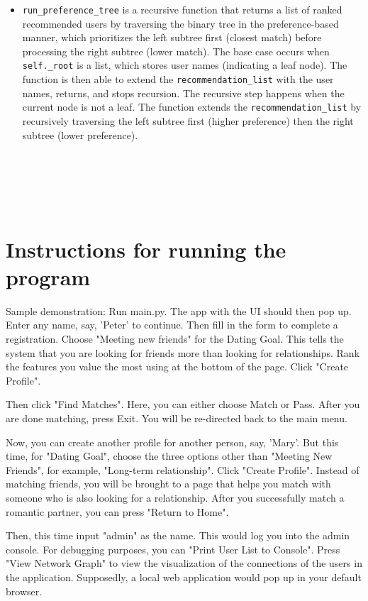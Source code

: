 \documentclass[fontsize=11pt]{article}
\begin{document}
\begin{itemize}
\\
\item \texttt{run\_preference\_tree} is a recursive function that returns a list of ranked recommended users by traversing the binary tree in the preference-based manner, which prioritizes the left subtree first (closest match) before processing the right subtree (lower match). The base case occurs when \texttt{self.\_root} is a list, which stores user names (indicating a leaf node). The function is then able to extend the \texttt{recommendation\_list} with the user names, returns, and stops recursion. The recursive step happens when the current node is not a leaf. The function extends the \texttt{recommendation\_list} by recursively traversing the left subtree first (higher preference) then the right subtree (lower preference).
\end{itemize}
\\

\\
\\

\\
\section*{Instructions for running the program}
Sample demonstration: Run main.py. The app with the UI should then pop up. Enter any name, say, 'Peter' to continue. Then fill in the form to complete a registration. Choose "Meeting new friends" for the Dating Goal. This tells the system that you are looking for friends more than looking for relationships. Rank the features you value the most using at the bottom of the page. Click "Create Profile".

Then click "Find Matches". Here, you can either choose Match or Pass. After you are done matching, press Exit. You will be re-directed back to the main menu.

Now, you can create another profile for another person, say, 'Mary'. But this time, for "Dating Goal", choose the three options other than "Meeting New Friends", for example, "Long-term relationship". Click "Create Profile". Instead of matching friends, you will be brought to a page that helps you match with someone who is also looking for a relationship. After you successfully match a romantic partner, you can press "Return to Home".

Then, this time input "admin" as the name. This would log you into the admin console. For debugging purposes, you can "Print User List to Console". Press "View Network Graph" to view the visualization of the connections of the users in the application. Supposedly, a local web application would pop up in your default browser.
\end{document}

